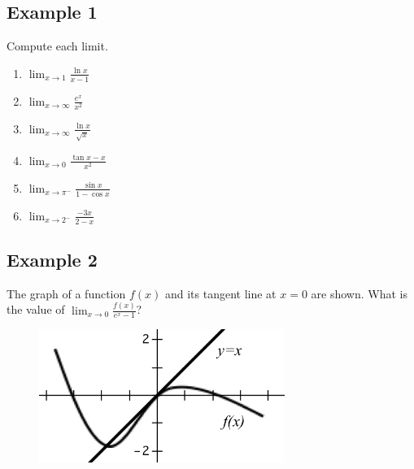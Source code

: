 \documentclass[10pt]{book}
\theoremstyle{definition}
\begin{document}
\subsection*{Example 1} Compute each limit. 
\begin{enumerate}[label=(\alph*)]
    \item $\displaystyle \lim_{x\rightarrow 1}\frac{\ln x}{x-1}$\vspace{4cm}
    \item $\displaystyle \lim_{x\rightarrow \infty}\frac{e^x}{x^2}$\vspace{4cm}
    \item $\displaystyle \lim_{x\rightarrow\infty}\frac{\ln x}{\sqrt{x}}$\vspace{4cm}
    \item $\displaystyle\lim_{x\rightarrow 0}\frac{\tan x-x}{x^2}$\vspace{4cm}
    \item $\displaystyle\lim_{x\rightarrow \pi^-}\frac{\sin x}{1-\cos x}$\vspace{3cm}
    \item $\displaystyle\lim_{x\rightarrow 2^-}\frac{-3x}{2-x}$\vspace{1cm}
\end{enumerate}
\subsection*{Example 2} The graph of a function $f(x)$ and its tangent line at $x=0$ are shown. What is the value of $\displaystyle\lim_{x\rightarrow 0}\frac{f(x)}{e^x-1}$?
\begin{figure}[h!]
    \includegraphics[width=8cm]{TantoGraph.png}
\end{figure}
\end{document}
